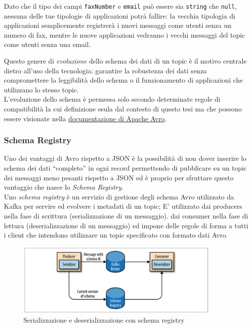 \documentclass[]{article}
\begin{document}
Dato che il tipo dei campi \texttt{faxNumber} e \texttt{email} può
essere sia \texttt{string} che \texttt{null}, nessuna delle tue
tipologie di applicazioni potrà fallire: la vecchia tipologia di
applicazioni semplicemente registrerà i nuovi messaggi come utenti senza
un numero di fax, mentre le nuove applicazioni vedranno i vecchi
messaggi del topic come utenti senza una email.

Questo genere di \emph{evoluzione} dello schema dei dati di un topic è
il motivo centrale dietro all'uso della tecnologia: garantire la
robustezza dei dati senza compromettere la leggibilità dello schema o il
funzionamento di applicazioni che utilizzano lo stesso topic.\\
L'evoluzione dello schema è permessa solo secondo determinate regole di
compatibilità la cui definizione esula dal contesto di questo tesi ma
che possono essere visionate nella
\href{https://avro.apache.org/docs/1.7.7/spec.html\#Schema+Resolution}{documentazione
di Apache Avro}.

\newpage

\subsubsection{Schema Registry}\label{schema-registry}

Uno dei vantaggi di Avro rispetto a JSON è la possibilità di non dover
inserire lo schema dei dati ``completo'' in ogni record permettendo di
pubblicare su un topic dei messaggi meno pesanti rispetto a JSON ed è
proprio per sfruttare questo vantaggio che nasce lo \emph{Schema
Registry}.\\
Uno \emph{schema registry} è un servizio di gestione degli schema Avro
utilizzato da Kafka per servire ed evolvere i metadati di un topic; E'
utilizzato dai producers nella fase di scrittura (serializzazione di un
messaggio). dai consumer nella fase di lettura (deserializzazione di un
messaggio) ed impone delle regole di forma a tutti i client che
intendono utilizzare un topic specificato con formato dati Avro.

\begin{figure}
\centering
\includegraphics[width=0.90000\textwidth]{../images/schema-registry.png}
\caption{Serializzazione e deserializzazione con schema registry
\label{figure_5}}
\end{figure}
\end{document}
